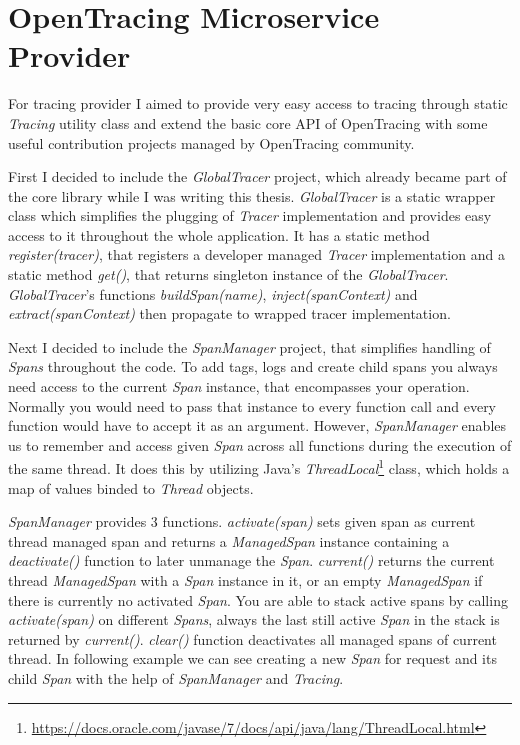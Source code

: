 \documentclass[12pt,oneside]{fithesis2}
\begin{document}
\section{OpenTracing Microservice Provider}

For tracing provider I aimed to provide very easy access to tracing through static \textit{Tracing} utility class and extend the basic core API of OpenTracing with some useful contribution projects managed by OpenTracing community.

First I decided to include the \textit{GlobalTracer} project, which already became part of the core library while I was writing this thesis. \textit{GlobalTracer} is a static wrapper class which simplifies the plugging of \textit{Tracer} implementation and provides easy access to it throughout the whole application. It has a static method \textit{register(tracer)}, that registers a developer managed \textit{Tracer} implementation and a static method \textit{get()}, that returns singleton instance of the \textit{GlobalTracer}. \textit{GlobalTracer}'s functions \textit{buildSpan(name)}, \textit{inject(spanContext)} and \textit{extract(spanContext)} then propagate to wrapped tracer implementation.

Next I decided to include the \textit{SpanManager} project, that simplifies handling of \textit{Spans} throughout the code. To add tags, logs and create child spans you always need access to the current \textit{Span} instance, that encompasses your operation. Normally you would need to pass that instance to every function call and every function would have to accept it as an argument. However, \textit{SpanManager} enables us to remember and access given \textit{Span} across all functions during the execution of the same thread.
It does this by utilizing Java's \textit{ThreadLocal}\footnote{\url{https://docs.oracle.com/javase/7/docs/api/java/lang/ThreadLocal.html}} class, which holds a map of values binded to \textit{Thread} objects.

\textit{SpanManager} provides 3 functions. \textit{activate(span)} sets given span as current thread managed span and returns a \textit{ManagedSpan} instance containing a \textit{deactivate()} function to later unmanage the \textit{Span}. \textit{current()} returns the current thread \textit{ManagedSpan} with a \textit{Span} instance in it, or an empty \textit{ManagedSpan} if there is currently no activated \textit{Span}. You are able to stack active spans by calling \textit{activate(span)} on different \textit{Spans}, always the last still active \textit{Span} in the stack is returned by \textit{current()}. \textit{clear()} function deactivates all managed spans of current thread. In following example we can see creating a new \textit{Span} for request and its child \textit{Span} with the help of \textit{SpanManager} and \textit{Tracing}.
\newline
\end{document}
